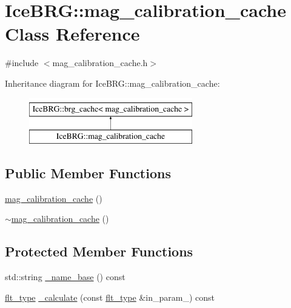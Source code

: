 \hypertarget{classIceBRG_1_1mag__calibration__cache}{}\section{Ice\+B\+R\+G\+:\+:mag\+\_\+calibration\+\_\+cache Class Reference}
\label{classIceBRG_1_1mag__calibration__cache}


{\ttfamily \#include $<$mag\+\_\+calibration\+\_\+cache.\+h$>$}

Inheritance diagram for Ice\+B\+R\+G\+:\+:mag\+\_\+calibration\+\_\+cache\+:\begin{figure}[H]
\begin{center}
\leavevmode
\includegraphics[height=2.000000cm]{classIceBRG_1_1mag__calibration__cache}
\end{center}
\end{figure}
\subsection*{Public Member Functions}
\begin{DoxyCompactItemize}
\item 
\hyperlink{classIceBRG_1_1mag__calibration__cache_a99d33bd36e6243810e1a5bc6dc262c08}{mag\+\_\+calibration\+\_\+cache} ()
\item 
\hyperlink{classIceBRG_1_1mag__calibration__cache_ad666da3efdda13aa3951e1cf54b5a17c}{$\sim$mag\+\_\+calibration\+\_\+cache} ()
\end{DoxyCompactItemize}
\subsection*{Protected Member Functions}
\begin{DoxyCompactItemize}
\item 
std\+::string \hyperlink{classIceBRG_1_1mag__calibration__cache_acd287d8811a0d0dfe63b39a7025bf065}{\+\_\+name\+\_\+base} () const 
\item 
\hyperlink{lib_2IceBRG__main_2common_8h_ad0f130a56eeb944d9ef2692ee881ecc4}{flt\+\_\+type} \hyperlink{classIceBRG_1_1mag__calibration__cache_a0ea0cf2413d6046542b5211f13bb9922}{\+\_\+calculate} (const \hyperlink{lib_2IceBRG__main_2common_8h_ad0f130a56eeb944d9ef2692ee881ecc4}{flt\+\_\+type} \&in\+\_\+param\+\_) const 
\end{DoxyCompactItemize}
